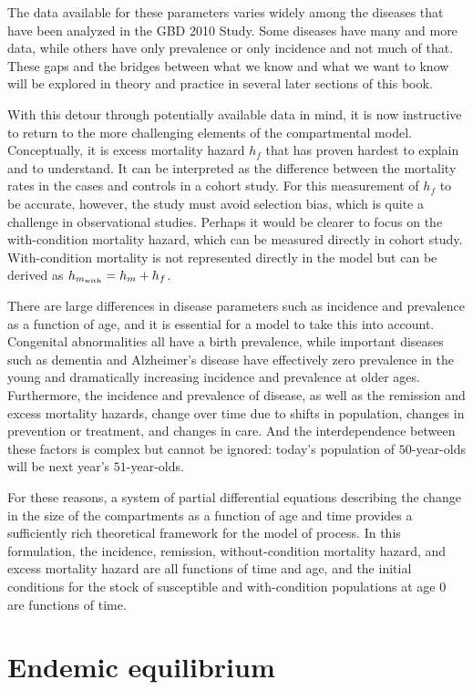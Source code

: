 The data available for these parameters varies widely among the
diseases that have been analyzed in the GBD 2010 Study. Some diseases
have many and more data, while others have only prevalence or only
incidence and not much of that. These gaps and the bridges between
what we know and what we want to know will be explored in theory and
practice in several later sections of this book.

With this detour through potentially available data in mind, it is now
instructive to return to the more challenging elements of the
compartmental model. Conceptually, it is excess mortality hazard $h_f$
that has proven hardest to explain and to understand. It can be
interpreted as the difference between the mortality rates in the cases
and controls in a cohort study.  For this measurement of $h_f$ to be
accurate, however, the study must avoid selection bias, which is quite
a challenge in observational studies.  Perhaps it would be clearer to
focus on the with-condition mortality hazard, which can be measured
directly in cohort study. With-condition mortality is not represented
directly in the model but can be derived as $h_{m_{\text{with}}} = h_m+h_f$.

There are large differences in disease parameters such as incidence
and prevalence as a function of age, and it is essential for a model
to take this into account.  Congenital abnormalities all have a birth
prevalence, while important diseases such as dementia and Alzheimer's
disease have effectively zero prevalence in the young and
dramatically increasing incidence and prevalence at older
ages. Furthermore, the incidence and prevalence of disease, as well as
the remission and excess mortality hazards, change over time due to
shifts in population, changes in prevention or treatment, and changes
in care. And the interdependence between these factors is complex but
cannot be ignored: today's population of $50$-year-olds will be next year's
$51$-year-olds.

For these reasons, a system of partial differential equations
describing the change in the size of the compartments as a function of
age and time provides a sufficiently rich theoretical framework for
the model of process.  In this formulation, the incidence, remission,
without-condition mortality hazard, and excess mortality hazard are all
functions of time and age, and the initial conditions for the stock of
susceptible and with-condition populations at age $0$ are functions of
time.

\section{Endemic equilibrium}
\label{theory-forward_sim-compartmental_model-simplying_assumptions}

